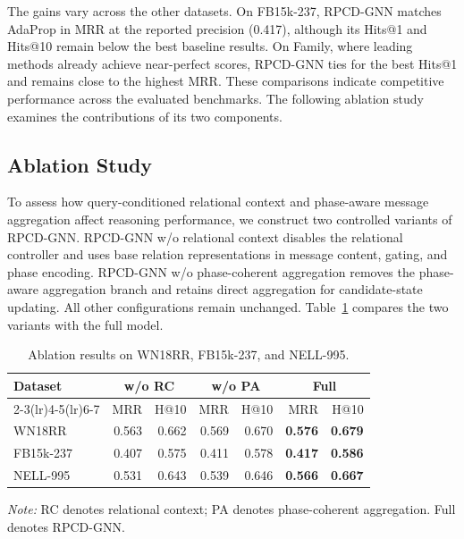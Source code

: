 \documentclass[a4paper,fleqn]{cas-dc}
\newcommand{\papertablestyle}{%
  \footnotesize
  \renewcommand{\arraystretch}{1.12}%
  \setlength{\tabcolsep}{3pt}%
}
\begin{document}
The gains vary across the other datasets. On FB15k-237, RPCD-GNN matches AdaProp in MRR at the reported precision (0.417), although its Hits@1 and Hits@10 remain below the best baseline results. On Family, where leading methods already achieve near-perfect scores, RPCD-GNN ties for the best Hits@1 and remains close to the highest MRR. These comparisons indicate competitive performance across the evaluated benchmarks. The following ablation study examines the contributions of its two components.

\subsection{Ablation Study}\label{subsec:ablation-study}

To assess how query-conditioned relational context and phase-aware message aggregation affect reasoning performance, we construct two controlled variants of RPCD-GNN. RPCD-GNN w/o relational context disables the relational controller and uses base relation representations in message content, gating, and phase encoding. RPCD-GNN w/o phase-coherent aggregation removes the phase-aware aggregation branch and retains direct aggregation for candidate-state updating. All other configurations remain unchanged. Table~\ref{tab:ablation-modules} compares the two variants with the full model.

\begin{table}[width=\columnwidth,pos=htbp]
\caption{Ablation results on WN18RR, FB15k-237, and NELL-995.}
\label{tab:ablation-modules}
\centering
\papertablestyle
\setlength{\tabcolsep}{1.5pt}
\begin{tabular*}{\linewidth}{@{}l@{\extracolsep{\fill}}rrrrrr@{}}
\toprule
Dataset & \multicolumn{2}{c}{w/o RC} & \multicolumn{2}{c}{w/o PA} & \multicolumn{2}{c}{Full} \\
\cmidrule(lr){2-3}\cmidrule(lr){4-5}\cmidrule(lr){6-7}
& MRR & H@10 & MRR & H@10 & MRR & H@10 \\
\midrule
WN18RR & 0.563 & 0.662 & 0.569 & 0.670 & \textbf{0.576} & \textbf{0.679} \\
FB15k-237 & 0.407 & 0.575 & 0.411 & 0.578 & \textbf{0.417} & \textbf{0.586} \\
NELL-995 & 0.531 & 0.643 & 0.539 & 0.646 & \textbf{0.566} & \textbf{0.667} \\
\bottomrule
\end{tabular*}
\par\smallskip
\parbox{\linewidth}{\footnotesize\emph{Note:} RC denotes relational context; PA denotes phase-coherent aggregation. Full denotes RPCD-GNN.}
\end{table}
\end{document}
